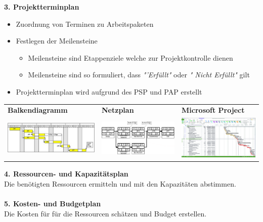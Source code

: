 \pagebreak
\textbf{3. Projektterminplan}
\begin{itemize}
	\item Zuordnung von Terminen zu Arbeitspaketen
	\item Festlegen der Meilensteine
    \begin{itemize}
    	\item Meilensteine sind Etappenziele welche zur Projektkontrolle dienen
    	\item Meilensteine sind so formuliert, dass \textit{"'Erfüllt"} oder \textit{" Nicht Erfüllt"} gilt
    \end{itemize}
	\item Projektterminplan wird aufgrund des PSP und PAP erstellt
\end{itemize}
\begin{table}[h!]
	\begin{tabular}{l l l}
		 \textbf{Balkendiagramm} & \textbf{Netzplan} & \textbf{Microsoft Project} \\
		 \includegraphics[width=6cm]{images/balkendiagramm} & \includegraphics[width=6cm]{images/netzplan}	& \includegraphics[width=6cm]{images/msproject}	 
	\end{tabular}
\end{table}
\vspace{0.2cm}
\textbf{4. Ressourcen- und Kapazitätsplan}\\
Die benötigten Ressourcen ermitteln und mit den Kapazitäten abstimmen. 
\\
\\
\textbf{5. Kosten- und Budgetplan}\\
Die Kosten für für die Ressourcen schätzen und Budget erstellen. 

